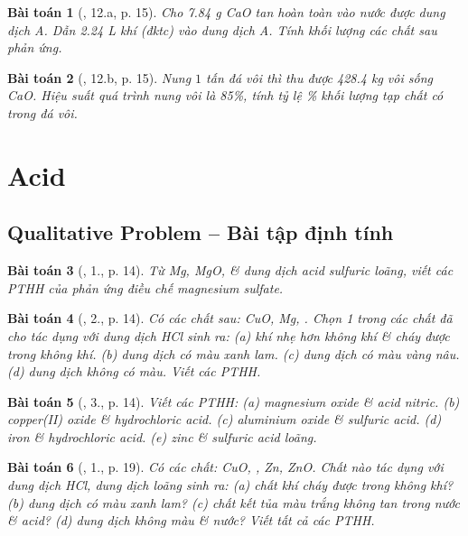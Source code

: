\documentclass{article}
\newtheorem{baitoan}{Bài toán}
\begin{document}
\begin{baitoan}[\cite{An_350_BT_Hoa_Hoc_9}, 12.a, p. 15]
	Cho \emph{7.84 g CaO} tan hoàn toàn vào nước được dung dịch A. Dẫn \emph{2.24 L} khí \emph{} (đktc) vào dung dịch A. Tính khối lượng các chất sau phản ứng.
\end{baitoan}

\begin{baitoan}[\cite{An_350_BT_Hoa_Hoc_9}, 12.b, p. 15]
	Nung $1$ tấn đá vôi thì thu được \emph{428.4 kg} vôi sống \emph{CaO}. Hiệu suất quá trình nung vôi là \emph{85\%}, tính tỷ lệ \emph{\%} khối lượng tạp chất có trong đá vôi.
\end{baitoan}


\section{Acid}

\subsection{Qualitative Problem -- Bài tập định tính}

\begin{baitoan}[\cite{SGK_Hoa_Hoc_9}, 1., p. 14]
	Từ \emph{Mg, MgO, } \& dung dịch acid sulfuric loãng, viết các PTHH của phản ứng điều chế magnesium sulfate.
\end{baitoan}

\begin{baitoan}[\cite{SGK_Hoa_Hoc_9}, 2., p. 14]
	Có các chất sau: \emph{CuO, Mg, }. Chọn 1 trong các chất đã cho tác dụng với dung dịch \emph{HCl} sinh ra: (a) khí nhẹ hơn không khí \& cháy được trong không khí. (b) dung dịch có màu xanh lam. (c) dung dịch có màu vàng nâu. (d) dung dịch không có màu. Viết các PTHH.
\end{baitoan}

\begin{baitoan}[\cite{SGK_Hoa_Hoc_9}, 3., p. 14]
	Viết các PTHH: (a) magnesium oxide \& acid nitric. (b) copper(II) oxide \& hydrochloric acid. (c) aluminium oxide \& sulfuric acid. (d) iron \& hydrochloric acid. (e) zinc \& sulfuric acid loãng.
\end{baitoan}

\begin{baitoan}[\cite{SGK_Hoa_Hoc_9}, 1., p. 19]
	Có các chất: \emph{CuO, , Zn, ZnO}. Chất nào tác dụng với dung dịch \emph{HCl}, dung dịch \emph{} loãng sinh ra: (a) chất khí cháy được trong không khí? (b) dung dịch có màu xanh lam? (c) chất kết tủa màu trắng không tan trong nước \& acid? (d) dung dịch không màu \& nước? Viết tất cả các PTHH.
\end{baitoan}
\end{document}

